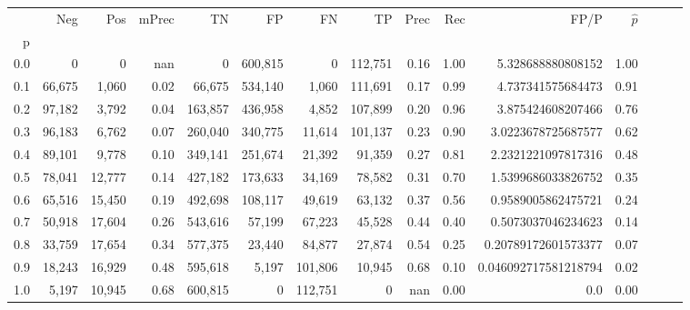 \begin{tabular}{rrrrrrrrrrrrrrr}
\toprule
{} &     Neg &     Pos & mPrec &       TN &       FP &       FN &       TP &  Prec &   Rec &                  FP/P & $\hat{p}$ \\
p   &         &         &       &          &          &          &          &       &       &                       &           \\
\midrule
0.0 &       0 &       0 &   nan &        0 &  600,815 &        0 &  112,751 &  0.16 &  1.00 &     5.328688880808152 &      1.00 \\
0.1 &  66,675 &   1,060 &  0.02 &   66,675 &  534,140 &    1,060 &  111,691 &  0.17 &  0.99 &     4.737341575684473 &      0.91 \\
0.2 &  97,182 &   3,792 &  0.04 &  163,857 &  436,958 &    4,852 &  107,899 &  0.20 &  0.96 &     3.875424608207466 &      0.76 \\
0.3 &  96,183 &   6,762 &  0.07 &  260,040 &  340,775 &   11,614 &  101,137 &  0.23 &  0.90 &    3.0223678725687577 &      0.62 \\
0.4 &  89,101 &   9,778 &  0.10 &  349,141 &  251,674 &   21,392 &   91,359 &  0.27 &  0.81 &    2.2321221097817316 &      0.48 \\
0.5 &  78,041 &  12,777 &  0.14 &  427,182 &  173,633 &   34,169 &   78,582 &  0.31 &  0.70 &    1.5399686033826752 &      0.35 \\
0.6 &  65,516 &  15,450 &  0.19 &  492,698 &  108,117 &   49,619 &   63,132 &  0.37 &  0.56 &    0.9589005862475721 &      0.24 \\
0.7 &  50,918 &  17,604 &  0.26 &  543,616 &   57,199 &   67,223 &   45,528 &  0.44 &  0.40 &    0.5073037046234623 &      0.14 \\
0.8 &  33,759 &  17,654 &  0.34 &  577,375 &   23,440 &   84,877 &   27,874 &  0.54 &  0.25 &   0.20789172601573377 &      0.07 \\
0.9 &  18,243 &  16,929 &  0.48 &  595,618 &    5,197 &  101,806 &   10,945 &  0.68 &  0.10 &  0.046092717581218794 &      0.02 \\
1.0 &   5,197 &  10,945 &  0.68 &  600,815 &        0 &  112,751 &        0 &   nan &  0.00 &                   0.0 &      0.00 \\
\bottomrule
\end{tabular}
